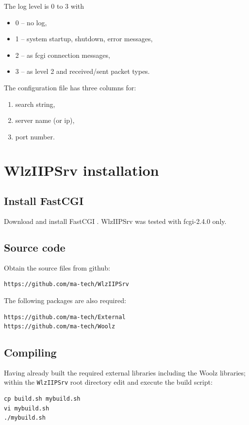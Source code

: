 \documentclass[11pt]{article}
\begin{document}
The log level is 0 to 3 with
\begin{itemize}
\item 0 -- no log,
\item 1 -- system startup, shutdown, error messages,
\item 2 -- as fcgi connection messages,
\item 3 -- as level 2 and received/sent packet types.
\end{itemize}

The configuration file has three columns for:
\begin{enumerate}
\item search string,
\item server name (or ip),
\item port number.
\end{enumerate}


\section{WlzIIPSrv installation}
\label{sec:ref:iipinstall}
\subsection{Install FastCGI}
Download and install FastCGI \cite{LIBFCGI}.
WlzIIPSrv was tested with fcgi-2.4.0 only.


\subsection{Source code}
Obtain the source files from github: 
\begin{verbatim}
https://github.com/ma-tech/WlzIIPSrv
\end{verbatim}

The following packages are also required:
\begin{verbatim}
https://github.com/ma-tech/External
https://github.com/ma-tech/Woolz
\end{verbatim}

\subsection{Compiling}
Having already built the required external libraries including the Woolz
libraries;
within the \texttt{WlzIIPSrv} root directory edit and execute the build script:
\begin{verbatim}
cp build.sh mybuild.sh
vi mybuild.sh
./mybuild.sh
\end{verbatim}
\end{document}
